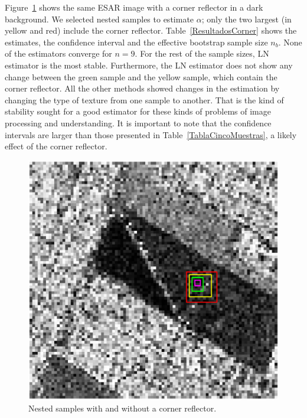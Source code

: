 \documentclass[twocolumn]{svjour3}
\begin{document}
Figure~\ref{CornerReflector} shows the same ESAR image with a corner reflector in a dark background. 
We selected nested samples to estimate $\alpha$; only the two largest (in yellow and red) include the corner reflector.
Table~\ref{ResultadosCorner} shows the estimates, the confidence interval and the effective bootstrap sample size $n_b$.
None of the estimators converge for $n=9$. 
For the rest of the sample sizes, LN estimator is the most stable. 
Furthermore, the LN estimator does not show any change between the green sample and the yellow sample, which contain the corner reflector. 
All the other methods showed changes in the estimation by changing the type of texture from one sample to another. 
That is the kind of stability sought for a good estimator for these kinds of problems of image processing and understanding. 
It is important to note that the confidence intervals are larger than those presented in Table~\ref{TablaCincoMuestras}, a likely effect of the corner reflector.

\begin{figure}[hbt]
\centering
\includegraphics[width=0.9\linewidth]{../Figures/CornerJulia_Roja2}
\caption{Nested samples with and without a corner reflector.}\label{CornerReflector}
\end{figure}
\end{document}
